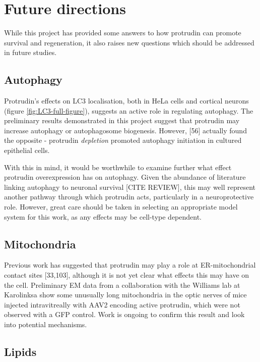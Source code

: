 \documentclass[
  12pt,
  a4paper,
]{book}
\begin{document}
\hypertarget{future-directions}{%
\section{Future directions}\label{future-directions}}

While this project has provided some answers to how protrudin can promote survival and regeneration, it also raises new questions which should be addressed in future studies.

\hypertarget{autophagy}{%
\subsection{Autophagy}\label{autophagy}}

Protrudin's effects on LC3 localisation, both in HeLa cells and cortical neurons (figure \ref{fig:LC3-full-figure}), suggests an active role in regulating autophagy. The preliminary results demonstrated in this project suggest that protrudin may increase autophagy or autophagosome biogenesis. However, {[}56{]} actually found the opposite - protrudin \emph{depletion} promoted autophagy initiation in cultured epithelial cells.

With this in mind, it would be worthwhile to examine further what effect protrudin overexpression has on autophagy. Given the abundance of literature linking autophagy to neuronal survival {[}CITE REVIEW{]}, this may well represent another pathway through which protrudin acts, particularly in a neuroprotective role. However, great care should be taken in selecting an appropriate model system for this work, as any effects may be cell-type dependent.

\hypertarget{mitochondria-1}{%
\subsection{Mitochondria}\label{mitochondria-1}}

Previous work has suggested that protrudin may play a role at ER-mitochondrial contact sites {[}33,103{]}, although it is not yet clear what effects this may have on the cell. Preliminary EM data from a collaboration with the Williams lab at Karolinksa show some unusually long mitochondria in the optic nerves of mice injected intravitreally with AAV2 encoding active protrudin, which were not observed with a GFP control. Work is ongoing to confirm this result and look into potential mechanisms.

\hypertarget{lipids}{%
\subsection{Lipids}\label{lipids}}
\end{document}

